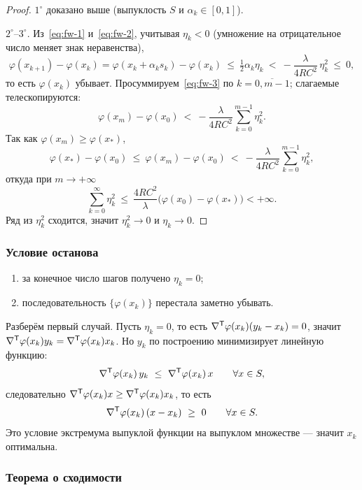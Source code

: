 \begin{proof}
$1^\circ$ доказано выше (выпуклость $S$ и $\alpha_k \in [0,1]$).

\medskip
$2^\circ$--$3^\circ$. Из~\eqref{eq:fw-1} и~\eqref{eq:fw-2}, учитывая
$\eta_k < 0$ (умножение на отрицательное число меняет знак неравенства),
\begin{equation}\label{eq:fw-3}
  \varphi(x_{k+1}) - \varphi(x_k)
  = \varphi(x_k + \alpha_k s_k) - \varphi(x_k)
  \ \le\ \tfrac12 \alpha_k \eta_k
  \ <\ -\frac{\lambda}{4RC^2}\, \eta_k^2 \ \le\ 0 ,
\end{equation}
то есть $\varphi(x_k)$ убывает. Просуммируем~\eqref{eq:fw-3} по
$k = \overline{0, m-1}$; слагаемые телескопируются:
\[
  \varphi(x_m) - \varphi(x_0)
  \ <\ -\frac{\lambda}{4RC^2} \sum_{k=0}^{m-1} \eta_k^2 .
\]
Так как $\varphi(x_m) \ge \varphi(x_*)$,
\[
  \varphi(x_*) - \varphi(x_0) \ \le\ \varphi(x_m) - \varphi(x_0)
  \ <\ -\frac{\lambda}{4RC^2} \sum_{k=0}^{m-1} \eta_k^2 ,
\]
откуда при $m \to +\infty$
\[
  \sum_{k=0}^{\infty} \eta_k^2
  \ \le\ \frac{4RC^2}{\lambda}\big(\varphi(x_0) - \varphi(x_*)\big) < +\infty .
\]
Ряд из $\eta_k^2$ сходится, значит $\eta_k^2 \to 0$ и $\eta_k \to 0$.
\end{proof}

\subsubsection*{Условие останова}

\begin{enumerate}[label=\arabic*),left=0pt]
  \item за конечное число шагов получено $\eta_k = 0$;
  \item последовательность $\{\varphi(x_k)\}$ перестала заметно убывать.
\end{enumerate}

Разберём первый случай. Пусть $\eta_k = 0$, то есть
$\nabla^{\mathsf{T}}\varphi(x_k)(y_k - x_k) = 0$, значит
$\nabla^{\mathsf{T}}\varphi(x_k) y_k = \nabla^{\mathsf{T}}\varphi(x_k) x_k$. Но $y_k$ по построению
минимизирует линейную функцию:
\[
  \nabla\T\varphi(x_k)\, y_k \ \le\ \nabla\T\varphi(x_k)\, x
  \qquad \forall x \in S ,
\]
следовательно $\nabla^{\mathsf{T}}\varphi(x_k) x \ge \nabla^{\mathsf{T}}\varphi(x_k) x_k$, то есть
\[
  \nabla^{\mathsf{T}}\varphi(x_k)\,(x - x_k) \ \ge\ 0 \qquad \forall x \in S .
\]
Это условие экстремума выпуклой функции на выпуклом множестве — значит $x_k$
оптимальна.

\subsubsection*{Теорема о сходимости}


